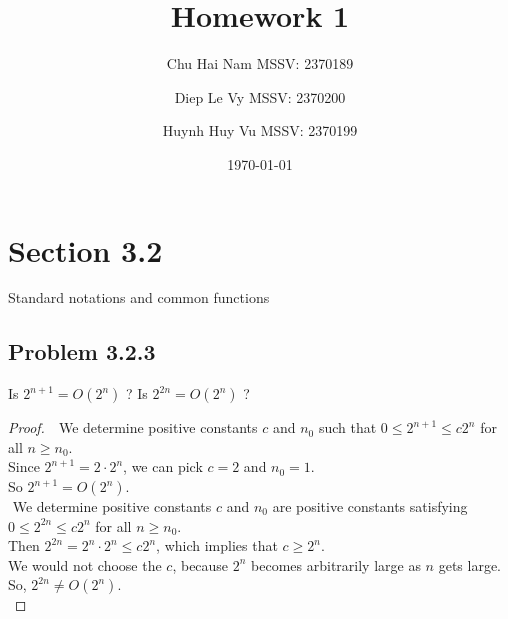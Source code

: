 \documentclass{article}
\title{Homework 1}
\author{Chu Hai Nam MSSV: 2370189}
\author{Diep Le Vy MSSV: 2370200}
\author{Huynh Huy Vu MSSV: 2370199}
\date\today
\begin{document}
\maketitle %

\section*{Section 3.2}
Standard notations and common functions

\subsection*{Problem 3.2.3}
Is $2^{n+1} = O(2^n)$ ? Is $2^{2n} = O(2^n)$ ?
\begin{proof}
    $ $\newline
    $ $\newline
    We determine positive constants $c$ and $n_0$ such that $0\le2^{n+1}\le c2^n$ for all $n\ge n_0$. \\
    Since $2^{n+1}=2\cdot2^n$, we can pick $c=2$ and $n_0=1$. \\
    So $2^{n+1}=O(2^n)$. \\
    $ $\newline
    We determine positive constants $c$ and $n_0$ are positive constants satisfying $0\le2^{2n}\le c2^n$ for all $n\ge n_0$. \\
    Then $2^{2n}=2^n\cdot2^n\le c2^n$, which implies that $c\ge2^n$. \\
    We would not choose the $c$, because $2^n$ becomes arbitrarily large as $n$ gets large. \\
    So, $2^{2n}\ne O(2^n)$. \\
\end{proof}

\newcommand{\Tworst}{T_{worst}(n)}
\newcommand{\Tbest}{T_{best}(n)}
\end{document}
